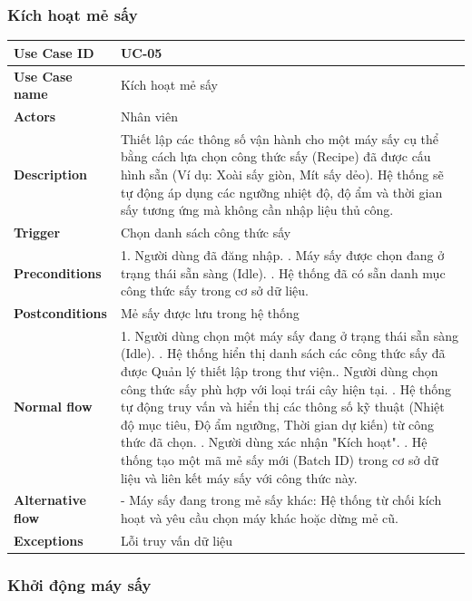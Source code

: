 \subsubsection{Kích hoạt mẻ sấy}
\begin{tabular}{|p{3.5cm}|p{12cm}|}
\hline
\textbf{Use Case ID} & UC-05 \\
\hline
\textbf{Use Case name} & Kích hoạt mẻ sấy \\
\hline
\textbf{Actors} & Nhân viên \\
\hline
\textbf{Description} & 
Thiết lập các thông số vận hành cho một máy sấy cụ thể bằng cách lựa chọn công thức sấy (Recipe) đã được cấu hình sẵn (Ví dụ: Xoài sấy giòn, Mít sấy dẻo). Hệ thống sẽ tự động áp dụng các ngưỡng nhiệt độ, độ ẩm và thời gian sấy tương ứng mà không cần nhập liệu thủ công. \\
\hline
\textbf{Trigger} & Chọn danh sách công thức sấy \\
\hline
\textbf{Preconditions} & 1. Người dùng đã đăng nhập. \newline
2. Máy sấy được chọn đang ở trạng thái sẵn sàng (Idle). \newline
3. Hệ thống đã có sẵn danh mục công thức sấy trong cơ sở dữ liệu. \\
\hline
\textbf{Postconditions} & Mẻ sấy được lưu trong hệ thống \\
\hline
\textbf{Normal flow} & 
1. Người dùng chọn một máy sấy đang ở trạng thái sẵn sàng (Idle). \newline
2. Hệ thống hiển thị danh sách các công thức sấy đã được Quản lý thiết lập trong thư viện.\newline 
3. Người dùng chọn công thức sấy phù hợp với loại trái cây hiện tại. \newline
4. Hệ thống tự động truy vấn và hiển thị các thông số kỹ thuật (Nhiệt độ mục tiêu, Độ ẩm ngưỡng, Thời gian dự kiến) từ công thức đã chọn. \newline
5. Người dùng xác nhận "Kích hoạt". \newline    
6. Hệ thống tạo một mã mẻ sấy mới (Batch ID) trong cơ sở dữ liệu và liên kết máy sấy với công thức này. \\
\hline
\textbf{Alternative flow} & 
- Máy sấy đang trong mẻ sấy khác: Hệ thống từ chối kích hoạt và yêu cầu chọn máy khác hoặc dừng mẻ cũ. \\
\hline
\textbf{Exceptions} & Lỗi truy vấn dữ liệu \\
\hline
\end{tabular}

\subsubsection{Khởi động máy sấy}

